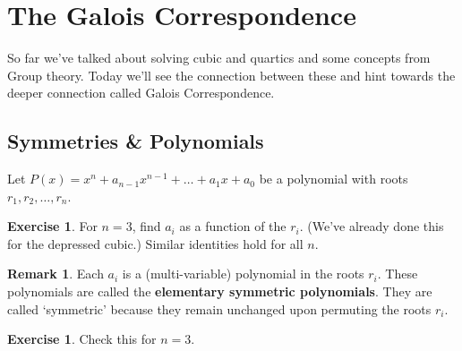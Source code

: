 \documentclass[reqno, 12pt, letter]{article}
\theoremstyle{plain}
\theoremstyle{definition}
\newtheorem{remark}[theorem]{Remark}
\newtheorem{exercise}[theorem]{Exercise}
\theoremstyle{remark}
\numberwithin{equation}{section}
\begin{document}
\newpage
\section{The Galois Correspondence}
So far we've talked about solving cubic and quartics and some concepts from Group theory. Today we'll see the connection between these and hint towards the deeper connection called Galois Correspondence.

	\subsection{Symmetries \& Polynomials}	
	
	Let $ P(x) = x^n + a_{n-1} x^{n-1} + \dots + a_1 x + a_0$ be a polynomial with roots $ r_1, r_2, \dots, r_n$.
	
	\begin{exercise}
		\label{exercise:elementary-symmetric-functions}
		For $ n=3$, find $ a_i$ as a function of the $ r_i$. (We've already done this for the depressed cubic.) Similar identities hold for all $ n$. 
	\end{exercise}
	\begin{remark}
		Each $ a_i$ is a (multi-variable) polynomial in the roots $ r_i$. These polynomials are called the \textbf{elementary symmetric polynomials}. They are called `symmetric' because they remain unchanged upon permuting the roots $ r_i$.
	\end{remark}
	
	\begin{exercise}
		Check this for $ n=3$.
	\end{exercise}
	
\end{document}
